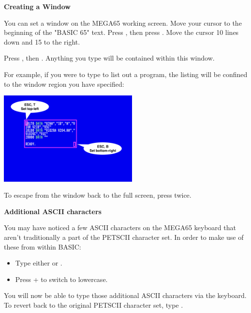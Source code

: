 \textbf{Creating a Window}

You can set a window on the MEGA65 working screen. Move your cursor to the beginning of the "BASIC 65" text. Press , then press . Move the cursor 10 lines down and 15 to the right.

Press , then . Anything you type will be contained within this window.

For example, if you were to type  to list out a program, the listing will be confined to the window region you have specified:

\begin{center}
\includegraphics[width={7cm}]{images/set-window.png}
\end{center}

To escape from the window back to the full screen, press  twice.

\textbf{Additional ASCII characters}

You may have noticed a few ASCII characters on the MEGA65 keyboard that aren't traditionally a part of the PETSCII character set. In order to make use of these from within BASIC:

\begin{itemize}
  \item Type either  or .
  \item Press \megasymbolkey +  to switch to lowercase.
\end{itemize}

You will now be able to type those additional ASCII characters via the keyboard. To revert back to the original PETSCII character set, type .

